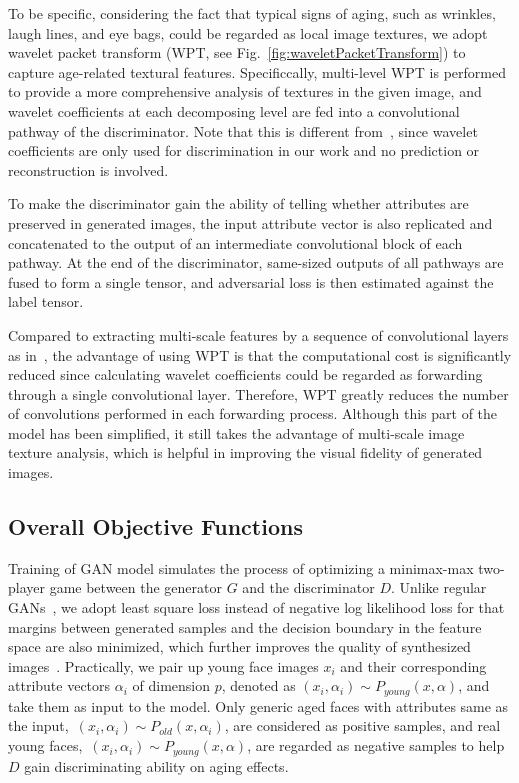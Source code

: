 \documentclass[10pt,twocolumn,letterpaper]{article}
\begin{document}
To be specific, considering the fact that typical signs of aging, such as wrinkles, laugh lines, and eye bags, could be regarded as local image textures, we adopt wavelet packet transform (WPT, see Fig.~\ref{fig:waveletPacketTransform}) to capture age-related textural features.
Specificcally, multi-level WPT is performed to provide a more comprehensive analysis of textures in the given image, and wavelet coefficients at each decomposing level are fed into a convolutional pathway of the discriminator. 
Note that this is different from~\cite{li2018wavelet}, since wavelet coefficients are only used for discrimination in our work and no prediction or reconstruction is involved.

To make the discriminator gain the ability of telling whether attributes are preserved in generated images, the input attribute vector is also replicated and concatenated to the output of an intermediate convolutional block of each pathway.
At the end of the discriminator, same-sized outputs of all pathways are fused to form a single tensor, and adversarial loss is then estimated against the label tensor.

Compared to extracting multi-scale features by a sequence of convolutional layers as in~\cite{yang2017learning}, the advantage of using WPT is that the computational cost is significantly reduced since calculating wavelet coefficients could be regarded as forwarding through a single convolutional layer. 
Therefore, WPT greatly reduces the number of convolutions performed in each forwarding process.
Although this part of the model has been simplified, it still takes the advantage of multi-scale image texture analysis, which is helpful in improving the visual fidelity of generated images. 

\subsection{Overall Objective Functions}

Training of GAN model simulates the process of optimizing a minimax-max two-player game between the generator $G$ and the discriminator $D$. 
Unlike regular GANs~\cite{goodfellow2014generative}, we adopt least square loss instead of negative log likelihood loss for that margins between generated samples and the decision boundary in the feature space are also minimized, which further improves the quality of synthesized images~\cite{mao2017least}. 
Practically, we pair up young face images $x_i$ and their corresponding attribute vectors $\alpha_i$ of dimension $p$, denoted as $(x_i, \alpha_i)\sim P_{young}(x, \alpha)$, and take them as input to the model. 
Only generic aged faces with attributes same as the input,~\ie $(x_i, \alpha_i)\sim P_{old}(x, \alpha_i)$, are considered as positive samples, and real young faces,~\ie $(x_i, \alpha_i)\sim P_{young}(x, \alpha)$, are regarded as negative samples to help $D$ gain discriminating ability on aging effects.
\end{document}
